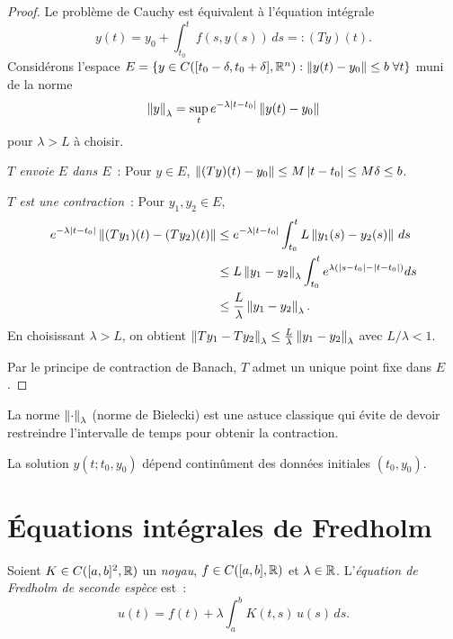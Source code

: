 \begin{proof}
Le probl\`eme de Cauchy est \'equivalent \`a l'\'equation int\'egrale
\[
  y(t) = y_0 + \int_{t_0}^{t} f(s, y(s)) \, ds =: (Ty)(t).
\]
Consid\'erons l'espace $E = \{y \in C([t_0 - \delta, t_0 + \delta], \mathbb{R}^n) :
\left\| y(t) - y_0 \right\| \leq b \; \forall t\}$ muni de la norme
\[
  \left\| y \right\|_\lambda = \sup_{t} e^{-\lambda \left| t - t_0 \right|} \left\| y(t) - y_0 \right\|
\]
pour $\lambda > L$ \`a choisir.

\emph{$T$ envoie $E$ dans $E$}~: Pour $y \in E$,
$\left\| (Ty)(t) - y_0 \right\| \leq M \left| t - t_0 \right| \leq M\delta \leq b$.

\emph{$T$ est une contraction}~: Pour $y_1, y_2 \in E$,
\begin{align*}
  e^{-\lambda\left| t-t_0 \right|} \left\| (Ty_1)(t) - (Ty_2)(t) \right\|
  &\leq e^{-\lambda\left| t-t_0 \right|} \int_{t_0}^{t} L \left\| y_1(s) - y_2(s) \right\| \, ds \\
  &\leq L \left\| y_1 - y_2 \right\|_\lambda \int_{t_0}^{t} e^{\lambda(\left| s-t_0 \right| - \left| t-t_0 \right|)} ds \\
  &\leq \frac{L}{\lambda} \left\| y_1 - y_2 \right\|_\lambda.
\end{align*}
En choisissant $\lambda > L$, on obtient $\left\| Ty_1 - Ty_2 \right\|_\lambda \leq
\frac{L}{\lambda} \left\| y_1 - y_2 \right\|_\lambda$ avec $L/\lambda < 1$.

Par le principe de contraction de Banach, $T$ admet un unique point fixe dans $E$.
\end{proof}

\begin{remarque}
La norme $\left\| \cdot \right\|_\lambda$ (norme de Bielecki) est une astuce classique qui \'evite de
devoir restreindre l'intervalle de temps pour obtenir la contraction.
\end{remarque}

\begin{corollaire}
La solution $y(t; t_0, y_0)$ d\'epend contin\^ument des donn\'ees initiales $(t_0, y_0)$.
\end{corollaire}

\section{\'Equations int\'egrales de Fredholm}

\begin{definition}
Soient $K \in C([a,b]^2, \mathbb{R})$ un \emph{noyau}, $f \in C([a,b], \mathbb{R})$ et
$\lambda \in \mathbb{R}$. L'\emph{\'equation de Fredholm de seconde esp\`ece} est~:
\[
  u(t) = f(t) + \lambda \int_a^b K(t,s) \, u(s) \, ds.
\]
\end{definition}

